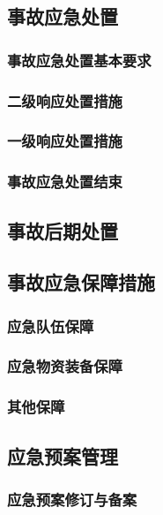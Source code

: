 \subsection{事故应急处置}
\subsubsection{事故应急处置基本要求}

\subsubsection{二级响应处置措施}

\subsubsection{一级响应处置措施}

\subsubsection{事故应急处置结束}

\subsection{事故后期处置}

\subsection{事故应急保障措施}
\subsubsection{应急队伍保障}

\subsubsection{应急物资装备保障}

\subsubsection{其他保障}

\subsection{应急预案管理}
\subsubsection{应急预案修订与备案}

